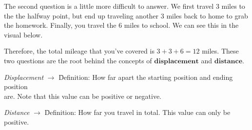 The second question is a little more difficult to answer. We first travel 3 miles to the the halfway point, but end up traveling another 3 miles back to home to grab the homework. Finally, you travel the 6 miles to school. We can see this in the visual below.

\begin{center}
\end{center}

Therefore, the total mileage that you've covered is $3 + 3 + 6 = 12$ miles. These two questions are the root behind the concepts of $\textbf{displacement}$ and $\textbf{distance}$. \par

\begin{tcolorbox}[definition]
    \begin{tabbing}
        \textit{Displacement} $\rightarrow$ \= Definition: How far apart the starting position and ending position \\ 
        \> are. Note that this value can be positive or negative.
    \end{tabbing} \vspace{11pt}
    \begin{tabbing}
        \textit{Distance} $\rightarrow$ \= Definition: How far you travel in total. This value can only be \\ 
        \> positive.
    \end{tabbing} 
\end{tcolorbox}

\begin{center}
\end{center}

